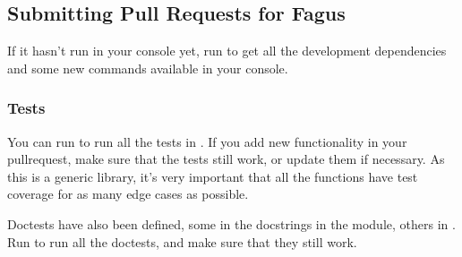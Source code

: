 \documentclass[a4paper,10pt,english]{sphinxmanual}
\begin{document}
\subsection{Submitting Pull Requests for Fagus}
\label{\detokenize{CONTRIBUTING:submitting-pull-requests-for-fagus}}
\sphinxAtStartPar
If it hasn’t run in your console yet, run  to get all the development dependencies and some new commands available in your console.


\subsubsection{Tests}
\label{\detokenize{CONTRIBUTING:tests}}
\sphinxAtStartPar
You can run  to run all the tests in . If you add new functionality in your pull\sphinxhyphen{}request, make sure that the tests still work, or update them if necessary. As this is a generic library, it’s very important that all the functions have test coverage for as many edge cases as possible.

\sphinxAtStartPar
Doctests have also been defined, some in the docstrings in the \sphinxhyphen{}module, others in . Run  to run all the doctests, and make sure that they still work.
\end{document}
